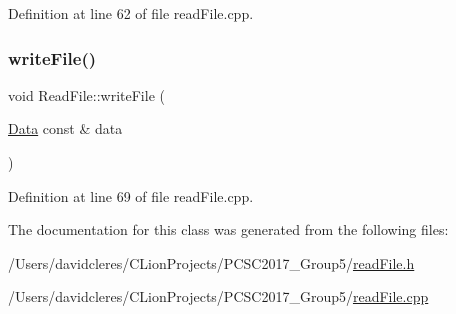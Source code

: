 Definition at line 62 of file read\+File.\+cpp.

\mbox{\label{class_read_file_ac11779a3630a2c1d62ab4566abb4034a}} 
\subsubsection{\texorpdfstring{write\+File()}{writeFile()}}
{\footnotesize\ttfamily void Read\+File\+::write\+File (\begin{DoxyParamCaption}\item[{\mbox{\hyperlink{struct_data}{Data}} const \&}]{data }\end{DoxyParamCaption})}







Definition at line 69 of file read\+File.\+cpp.



The documentation for this class was generated from the following files\+:\begin{DoxyCompactItemize}
\item 
/\+Users/davidcleres/\+C\+Lion\+Projects/\+P\+C\+S\+C2017\+\_\+\+Group5/\mbox{\hyperlink{read_file_8h}{read\+File.\+h}}\item 
/\+Users/davidcleres/\+C\+Lion\+Projects/\+P\+C\+S\+C2017\+\_\+\+Group5/\mbox{\hyperlink{read_file_8cpp}{read\+File.\+cpp}}\end{DoxyCompactItemize}
